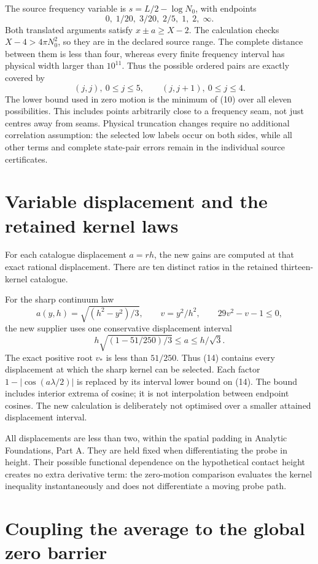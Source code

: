 \documentclass[11pt,a4paper]{article}
\begin{document}
The source frequency variable is \(s=L/2-\log N_0\), with endpoints
\[
0,\;1/20,\;3/20,\;2/5,\;1,\;2,\;\infty.
\]
Both translated arguments satisfy \(x\pm a\ge X-2\). The calculation checks
\(X-4>4\pi N_0^2\), so they are in the declared source range. The complete
distance between them is less than four, whereas every finite frequency
interval has physical width larger than \(10^{11}\). Thus the possible
ordered pairs are exactly covered by
\[
(j,j),\ 0\le j\le5,\qquad (j,j+1),\ 0\le j\le4.
\tag{13}
\]
The lower bound used in zero motion is the minimum of (10) over all eleven
possibilities. This includes points arbitrarily close to a frequency seam,
not just centres away from seams. Physical truncation changes require no
additional correlation assumption: the selected low labels occur on both
sides, while all other terms and complete state-pair errors remain in the
individual source certificates.

\section{Variable displacement and the retained kernel laws}\label{variable-displacement-and-the-retained-kernel-laws}

For each catalogue displacement \(a=rh\), the new gains are computed at that
exact rational displacement. There are ten distinct ratios in the retained
thirteen-kernel catalogue.

For the sharp continuum law
\[
 a(y,h)=\sqrt{(h^2-y^2)/3},\qquad
 v=y^2/h^2,\qquad 29v^2-v-1\le0,
\]
the new supplier uses one conservative displacement interval
\[
 h\sqrt{(1-51/250)/3}\le a\le h/\sqrt3.
\tag{14}
\]
The exact positive root \(v_*\) is less than \(51/250\). Thus (14) contains
every displacement at which the sharp kernel can be selected. Each factor
\(1-|\cos(a\lambda/2)|\) is replaced by its interval lower bound on (14).
The bound includes interior extrema of cosine; it is not interpolation
between endpoint cosines. The new calculation is deliberately not optimised
over a smaller attained displacement interval.

All displacements are less than two, within the spatial padding in Analytic Foundations, Part A. They are
held fixed when differentiating the probe in height. Their possible
functional dependence on the hypothetical contact height creates no extra
derivative term: the zero-motion comparison evaluates the kernel inequality
instantaneously and does not differentiate a moving probe path.

\section{Coupling the average to the global zero barrier}\label{coupling-the-average-to-the-global-zero-barrier}
\end{document}
